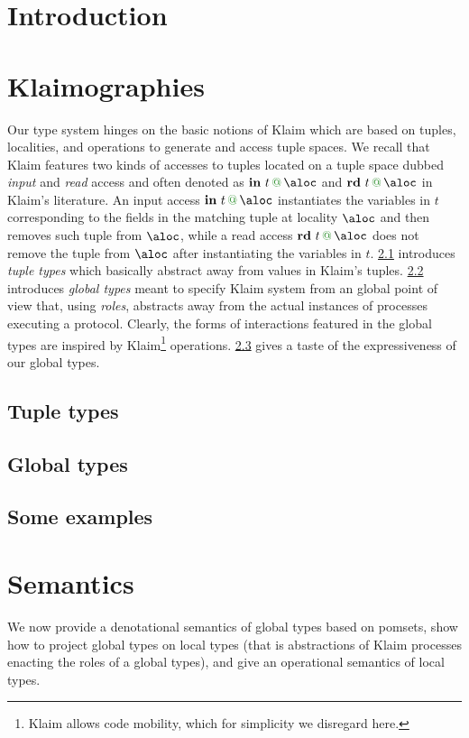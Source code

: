 \documentclass[runningheads,a4paper]{llncs}
\begin{document}
\section{Introduction}
\label{sec:intro}


\section{Klaimographies}
\label{sec:klaimographies}
Our type system hinges on the basic notions of Klaim which are based
on tuples, localities, and operations to generate and access tuple
spaces.
%
We recall that Klaim features two kinds of accesses to tuples located
on a tuple space dubbed \emph{input} and \emph{read} access and often
denoted as $\textbf{in}\ t \at \aloc$ and
$\textbf{rd}\ t \at \aloc$ in Klaim's literature.
%
An input access $\textbf{in}\ t \at \aloc$ instantiates the
variables in $t$ corresponding to the fields in the matching
tuple at locality $\aloc$ and then removes such tuple from $\aloc$, while
a read access $\textbf{rd}\ t \at \aloc$ does not remove the
tuple from $\aloc$ after instantiating the variables in $t$.
%
\cref{sec:tuples} introduces \emph{tuple types} which basically
abstract away from values in Klaim's tuples.
%
\cref{sec:gt} introduces \emph{global types} meant to specify
Klaim system from an global point of view that, using \emph{roles},
abstracts away from the actual instances of processes executing a
protocol.
%
Clearly, the forms of interactions featured in the global types are
inspired by Klaim\footnote{Klaim allows code mobility, which for
  simplicity we disregard here.} operations.
%
\cref{sec:examples} gives a taste of the expressiveness of our global
types.
\subsection{Tuple types}
\label{sec:tuples}

\subsection{Global types}
\label{sec:gt}

\subsection{Some examples}
\label{sec:examples}

%

\section{Semantics}
We now provide a denotational semantics of global types based on
pomsets, show how to project global types on local types (that is
abstractions of Klaim processes enacting the roles of a global types),
and give an operational semantics of local types.
\end{document}

